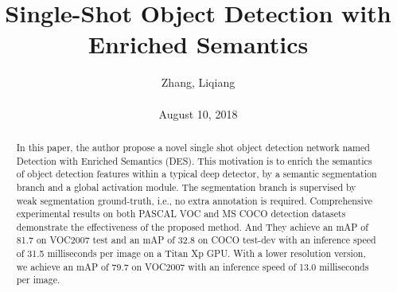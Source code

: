 \documentclass[10pt,twocolumn,letterpaper]{article}
\title{\textbf{Single-Shot Object Detection with Enriched Semantics}}
\author{Zhang, Liqiang\\\\August 10, 2018}
\begin{document}
\maketitle
\par
\begin{abstract}
In this paper, the author propose a novel single shot object detection network
named Detection with Enriched Semantics (DES). This  motivation is to enrich the semantics of object detection features  within  a  typical  deep  detector,  by  a  semantic  segmentation  branch  and  a  global  activation  module.  The segmentation  branch  is  supervised  by  weak  segmentation ground-truth, i.e., no extra annotation is required. Comprehensive experimental results on both PASCAL VOC and MS COCO detection  datasets  demonstrate  the  effectiveness  of  the  proposed method. And They achieve an mAP of 81.7 on VOC2007 test and an mAP of
32.8 on COCO test-dev with an inference speed of 31.5 milliseconds per image on a Titan Xp GPU. With a lower resolution version, we achieve an mAP of 79.7 on VOC2007
with an inference speed of 13.0 milliseconds per image.
\end{abstract}
\end{document}
